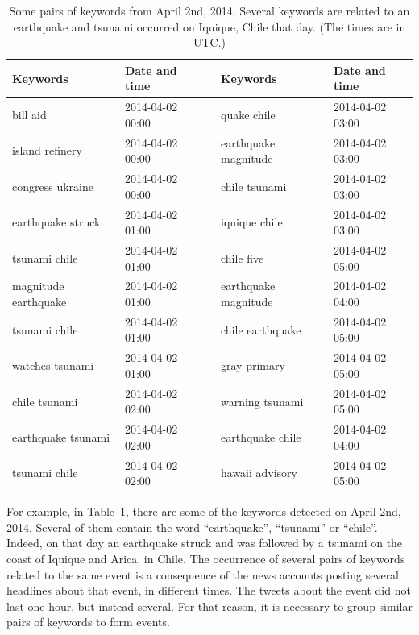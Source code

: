 \begin{table}

\begin{center}
\begin{tabular}{lllll}
\toprule
  Keywords              &  Date and time     &     &  Keywords              &  Date and time     \\
\midrule
 bill aid              &  2014-04-02 00:00  &     &  quake chile           &  2014-04-02 03:00  \\
 island refinery       &  2014-04-02 00:00  &     &  earthquake magnitude  &  2014-04-02 03:00  \\
 congress ukraine      &  2014-04-02 00:00  &     &  chile tsunami         &  2014-04-02 03:00  \\
 earthquake struck     &  2014-04-02 01:00  &     &  iquique chile         &  2014-04-02 03:00  \\
 tsunami chile         &  2014-04-02 01:00  &     &  chile five            &  2014-04-02 05:00  \\
 magnitude earthquake  &  2014-04-02 01:00  &     &  earthquake magnitude  &  2014-04-02 04:00  \\
 tsunami chile         &  2014-04-02 01:00  &     &  chile earthquake      &  2014-04-02 05:00  \\
 watches tsunami       &  2014-04-02 01:00  &     &  gray primary          &  2014-04-02 05:00  \\
 chile tsunami         &  2014-04-02 02:00  &     &  warning tsunami       &  2014-04-02 05:00  \\
 earthquake tsunami    &  2014-04-02 02:00  &     &  earthquake chile      &  2014-04-02 04:00  \\
 tsunami chile         &  2014-04-02 02:00  &     &  hawaii advisory       &  2014-04-02 05:00  \\
\bottomrule
\end{tabular}
\end{center}
\caption[Example pairs of keywords from April 2nd, 2014.]{Some pairs of
  keywords from April 2nd, 2014. Several keywords are related to an
  earthquake and tsunami occurred on Iquique, Chile that day. (The
  times are in UTC.)}\label{table:example-pairs}
\end{table}


For example, in Table~\ref{table:example-pairs}, there are some of the keywords
detected on April 2nd, 2014. 
%
Several of them contain the word ``earthquake'', ``tsunami'' or ``chile''.
%
Indeed, on that day an earthquake struck and was followed by a tsunami on the
coast of Iquique and Arica, in Chile. 
%
The occurrence of several pairs of keywords related to the same event is a
consequence of the news accounts posting several headlines about that event, in
different times. 
%
The tweets about the event did not last one hour, but instead several. 
%
For that reason, it is necessary to group similar pairs of keywords to form
events.

